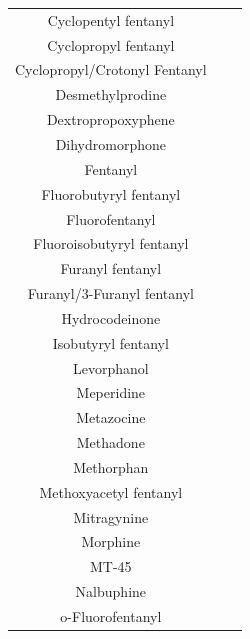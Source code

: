 \documentclass[12pt]{mcmthesis}
\begin{document}
\begin{appendices}
\begin{longtable}{|c|c|c|}
Cyclopentyl fentanyl          &                      &        \\
Cyclopropyl fentanyl          &                      &        \\
Cyclopropyl/Crotonyl Fentanyl &                      &        \\
Desmethylprodine              &                      &        \\
Dextropropoxyphene            &                      &        \\
Dihydromorphone               &                      &        \\
Fentanyl                      &                      &        \\
Fluorobutyryl fentanyl        &                      &        \\
Fluorofentanyl                &                      &        \\
Fluoroisobutyryl fentanyl     &                      &        \\
Furanyl fentanyl              &                      &        \\
Furanyl/3-Furanyl fentanyl    &                      &        \\
Hydrocodeinone                &                      &        \\
Isobutyryl fentanyl           &                      &        \\
Levorphanol                   &                      &        \\
Meperidine                    &                      &        \\
Metazocine                    &                      &        \\
Methadone                     &                      &        \\
Methorphan                    &                      &        \\
Methoxyacetyl fentanyl        &                      &        \\
Mitragynine                   &                      &        \\
Morphine                      &                      &        \\
MT-45                         &                      &        \\
Nalbuphine                    &                      &        \\
o-Fluorofentanyl              &                      &        \\

\end{longtable}
\end{appendices}
\end{document}
